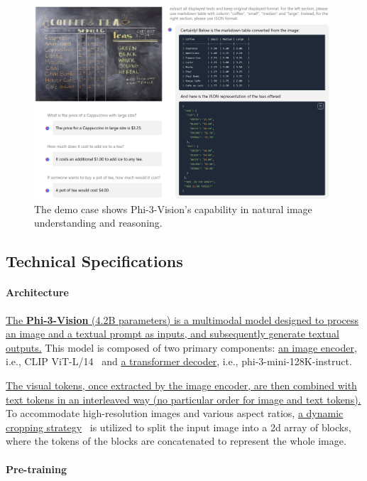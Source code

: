 \documentclass[11pt]{article}
\newcommand{\phivision}{Phi-3-Vision\xspace}
\begin{document}
\begin{figure}[h]
    \centering
    \includegraphics[width=0.98\textwidth]{phi3v-teaser.png}
    \caption{The demo case shows \phivision's capability in natural image understanding and reasoning.}
\end{figure}

\subsection{Technical Specifications}

\paragraph{Architecture}

\uline{The \textbf{\phivision} (4.2B parameters) is a multimodal model designed to process an image and a textual prompt as inputs, and subsequently generate textual outputs.} This model is composed of two primary components: \uline{an image encoder}, i.e., CLIP ViT-L/14~\cite{radford2021learning} and \uline{a transformer decoder}, i.e., phi-3-mini-128K-instruct.

\uline{The visual tokens, once extracted by the image encoder, are then combined with text tokens in an interleaved way (no particular order for image and text tokens).} To accommodate high-resolution images and various aspect ratios, \uline{a dynamic cropping strategy}~\cite{dong2024internlm} is utilized to split the input image into a 2d array of blocks, where the tokens of the blocks are concatenated to represent the whole image.  

\paragraph{Pre-training} 
\end{document}
